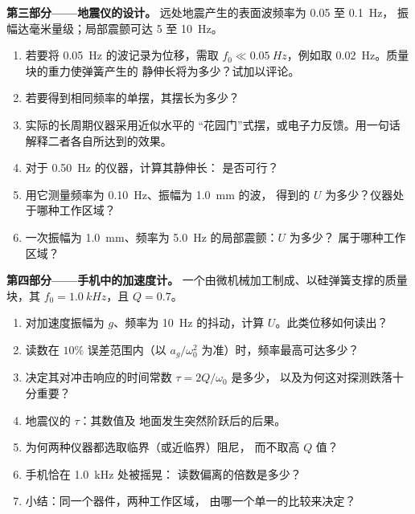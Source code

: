\begin{problem}
\medskip
\noindent\textbf{第三部分——地震仪的设计。}
远处地震产生的表面波频率为 \qty{0.05}{} 至 \qty{0.1}{Hz}，
振幅达毫米量级；局部震颤可达 \qty{5}{} 至 \qty{10}{Hz}。
\begin{enumerate}[resume]
  \item 若要将 \qty{0.05}{Hz} 的波记录为位移，需取
        $f_0 \ll \qty{0.05}{Hz}$，例如取 \qty{0.02}{Hz}。质量块的重力使弹簧产生的
        静伸长将为多少？试加以评论。
  \item 若要得到相同频率的单摆，其摆长为多少？
  \item 实际的长周期仪器采用近似水平的
        “花园门”式摆，或电子力反馈。用一句话
        解释二者各自所达到的效果。
  \item 对于 \qty{0.50}{Hz} 的仪器，计算其静伸长：
        是否可行？
  \item 用它测量频率为 \qty{0.10}{Hz}、振幅为 \qty{1.0}{mm} 的波，
        得到的 $U$ 为多少？仪器处于哪种工作区域？
  \item 一次振幅为 \qty{1.0}{mm}、频率为 \qty{5.0}{Hz} 的局部震颤：$U$ 为多少？
        属于哪种工作区域？
\end{enumerate}

\medskip
\noindent\textbf{第四部分——手机中的加速度计。}
一个由微机械加工制成、以硅弹簧支撑的质量块，其 $f_0 = \qty{1.0}{kHz}$，且
$Q = 0.7$。
\begin{enumerate}[resume]
  \item 对加速度振幅为 $g$、频率为 \qty{10}{Hz} 的抖动，计算
        $U$。此类位移如何读出？
  \item 读数在 $10\%$ 误差范围内（以 $a_g/\omega_0^2$ 为准）时，频率最高可达多少？
  \item 决定其对冲击响应的时间常数 $\tau = 2Q/\omega_0$ 是多少，
        以及为何这对探测跌落十分重要？
  \item 地震仪的 $\tau$：其数值及
        地面发生突然阶跃后的后果。
  \item 为何两种仪器都选取临界（或近临界）阻尼，
        而不取高 $Q$ 值？
  \item 手机恰在 \qty{1.0}{kHz} 处被摇晃：
        读数偏离的倍数是多少？
  \item 小结：同一个器件，两种工作区域，
        由哪一个单一的比较来决定？
\end{enumerate}
\end{problem}
